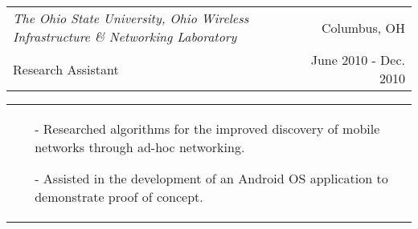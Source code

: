 \begin{tabularx}{\textwidth}{ L R }
  \textit{The Ohio State University, Ohio Wireless Infrastructure \& Networking Laboratory} & Columbus, OH \\
  Research Assistant & June 2010 - Dec. 2010 \\
\end{tabularx}
\begin{tabularx}{\textwidth}{ X }
  \begin{small}
  \begin{itemize}
    \itemsep{}
    \item[-] Researched algorithms for the improved discovery of mobile networks through ad-hoc networking.
    \item[-] Assisted in the development of an Android OS application to demonstrate proof of concept.
  \end{itemize}
  \end{small}
\end{tabularx}
